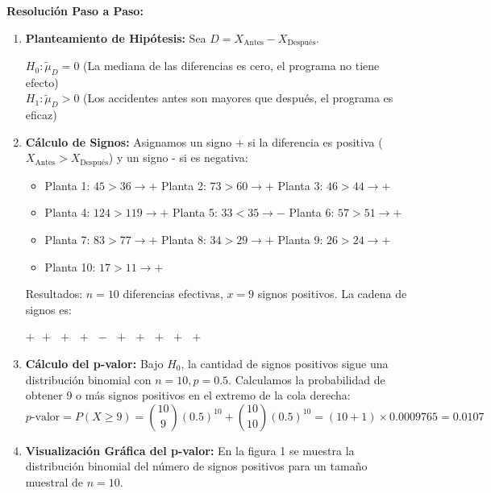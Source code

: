 \documentclass[10pt,a4paper]{article}
\begin{document}
\textbf{Resolución Paso a Paso:}
\begin{enumerate}[leftmargin=18pt,itemsep=2pt,topsep=2pt,parsep=0pt]
  \item \textbf{Planteamiento de Hipótesis:} Sea $D = X_{\text{Antes}} - X_{\text{Después}}$.

  $H_0 : \tilde{\mu}_D = 0$ \quad (La mediana de las diferencias es cero, el programa no tiene efecto)\\
  $H_1 : \tilde{\mu}_D > 0$ \quad (Los accidentes antes son mayores que después, el programa es eficaz)

  \item \textbf{Cálculo de Signos:} Asignamos un signo $+$ si la diferencia es positiva ($X_{\text{Antes}} > X_{\text{Después}}$) y un signo - si es negativa:
  \begin{itemize}[leftmargin=12pt,itemsep=1pt,topsep=1pt,parsep=0pt]
    \item Planta 1: $45>36 \rightarrow +$ \quad Planta 2: $73>60 \rightarrow +$ \quad Planta 3: $46>44 \rightarrow +$
    \item Planta 4: $124>119 \rightarrow +$ \quad Planta 5: $33<35 \rightarrow -$ \quad Planta 6: $57>51 \rightarrow +$
    \item Planta 7: $83>77 \rightarrow +$ \quad Planta 8: $34>29 \rightarrow +$ \quad Planta 9: $26>24 \rightarrow +$
    \item Planta 10: $17>11 \rightarrow +$
  \end{itemize}

  Resultados: $n = 10$ diferencias efectivas, $x = 9$ signos positivos. La cadena de signos es:

  \centerline{$+\ \ +\ \ +\ \ +\ \ -\ \ +\ \ +\ \ +\ \ +\ \ +$}

  \item \textbf{Cálculo del p-valor:} Bajo $H_0$, la cantidad de signos positivos sigue una distribución binomial con $n = 10, p = 0.5$. Calculamos la probabilidad de obtener 9 o más signos positivos en el extremo de la cola derecha:
  \[
  p\text{-valor} = P(X \geq 9) = \binom{10}{9}(0.5)^{10} + \binom{10}{10}(0.5)^{10} = (10+1)\times 0.0009765 = \mathbf{0.0107}
  \]

  \item \textbf{Visualización Gráfica del p-valor:} En la figura 1 se muestra la distribución binomial del número de signos positivos para un tamaño muestral de $n = 10$.
\end{enumerate}
\end{document}
